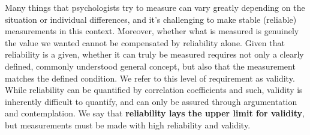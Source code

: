 \documentclass{ltjbook}
\begin{document}
Many things that psychologists try to measure can vary greatly depending on the situation or individual differences, and it's challenging to make stable (reliable) measurements in this context. Moreover, whether what is measured is genuinely the value we wanted cannot be compensated by reliability alone. Given that reliability is a given, whether it can truly be measured requires not only a clearly defined, commonly understood general concept, but also that the measurement matches the defined condition. We refer to this level of requirement as validity. While reliability can be quantified by correlation coefficients and such, validity is inherently difficult to quantify, and can only be assured through argumentation and contemplation. We say that \textbf{reliability lays the upper limit for validity}, but measurements must be made with high reliability and validity.

\end{document}
